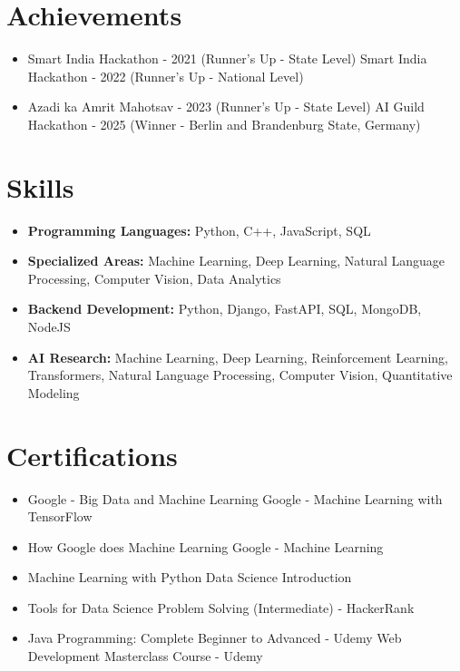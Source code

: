 \documentclass[a4paper,10pt]{article}
\begin{document}
\section*{Achievements}
\begin{itemize}
\item Smart India Hackathon - 2021 (Runner's Up - State Level) \hfill Smart India Hackathon - 2022 (Runner's Up - National Level)
\item Azadi ka Amrit Mahotsav - 2023 (Runner's Up - State Level) \hfill AI Guild Hackathon - 2025 (Winner - Berlin and Brandenburg State, Germany)
\end{itemize}

\section*{Skills}
\begin{itemize}
  \item \textbf{Programming Languages:} Python, C++, JavaScript, SQL
  \item \textbf{Specialized Areas:} Machine Learning, Deep Learning, Natural Language Processing, Computer Vision, Data Analytics
  \item \textbf{Backend Development:} Python, Django, FastAPI, SQL, MongoDB, NodeJS
  \item \textbf{AI Research:} Machine Learning, Deep Learning, Reinforcement Learning, Transformers, Natural Language Processing, Computer Vision, Quantitative Modeling
\end{itemize}

\section*{Certifications}
\begin{itemize}
\item Google - Big Data and Machine Learning \hfill Google - Machine Learning with TensorFlow
\item How Google does Machine Learning \hfill Google - Machine Learning
\item Machine Learning with Python \hfill Data Science Introduction
\item Tools for Data Science \hfill Problem Solving (Intermediate) - HackerRank
\item Java Programming: Complete Beginner to Advanced - Udemy \hfill Web Development Masterclass Course - Udemy
\end{itemize}
\end{document}
